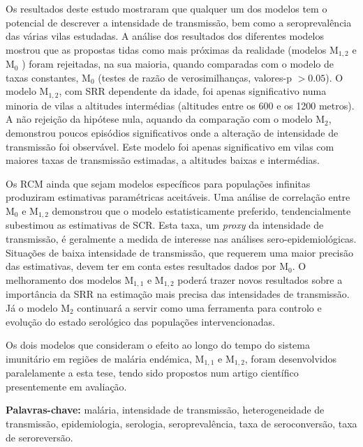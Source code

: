 \begin{resumo}
Os resultados deste estudo mostraram que qualquer um dos modelos tem o potencial de descrever a intensidade de transmissão, bem como a seroprevalência das várias vilas estudadas.
A análise dos resultados dos diferentes modelos mostrou que as propostas tidas como mais próximas da realidade (modelos M$_{1,2}$ e M$_{0}$ ) foram rejeitadas, na sua maioria, quando comparadas com o modelo de taxas constantes, M$_{0}$ (testes de razão de verosimilhanças, valores-p $>0.05$).
O modelo M$_{1,2}$, com SRR dependente da idade, foi apenas significativo numa minoria de vilas a altitudes intermédias (altitudes entre os 600 e os 1200 metros).
A não rejeição da hipótese nula, aquando da comparação com o modelo M$_{2}$, demonstrou poucos episódios significativos onde a alteração de intensidade de transmissão foi observável.
Este modelo foi apenas significativo em vilas com maiores taxas de transmissão estimadas, a altitudes baixas e intermédias.

Os RCM ainda que sejam modelos específicos para populações infinitas produziram estimativas paramétricas aceitáveis.
Uma análise de correlação entre M$_{0}$ e M$_{1,2}$ demonstrou que o modelo estatisticamente preferido, tendencialmente subestimou as estimativas de SCR.
Esta taxa, um \textit{proxy} da intensidade de transmissão, é geralmente a medida de interesse nas análises sero-epidemiológicas.
Situações de baixa intensidade de transmissão, que requerem uma maior precisão das estimativas, devem ter em conta estes resultados dados por M$_{0}$.
O melhoramento dos modelos M$_{1,1}$ e M$_{1,2}$ poderá trazer novos resultados sobre a importância da SRR na estimação mais precisa das intensidades de transmissão.
Já o modelo M$_{2}$ continuará a servir como uma ferramenta para controlo e evolução do estado serológico das populações intervencionadas.

Os dois modelos que consideram o efeito ao longo do tempo do sistema imunitário em regiões de malária endémica, M$_{1,1}$ e M$_{1,2}$, foram desenvolvidos paralelamente a esta tese, tendo sido propostos num artigo científico presentemente em avaliação.

\textbf{Palavras-chave:} malária, intensidade de transmissão, heterogeneidade de transmissão, epidemiologia, serologia, seroprevalência, taxa de seroconversão, taxa de seroreversão.

\end{resumo}
